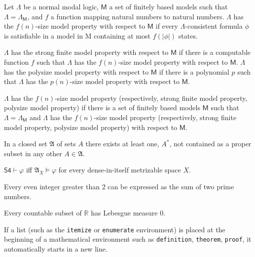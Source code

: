 \documentclass[manuscript]{BSLstyle} %
\begin{document}
\begin{definition}
	Let $\Lambda$ be a normal modal logic, $\mathsf{M}$ a set of finitely based models such that $\Lambda=\Lambda_\mathsf{M}$, and $f$ a function mapping natural numbers to natural numbers. $\Lambda$ has the $f(n)$-size model property with respect to $\mathsf{M}$ if every $\Lambda$-consistent formula $\phi$ is satisfiable in a model in M containing at most $f(|\phi|)$ states.
	
	$\Lambda$ has the strong finite model property with respect to $\mathsf{M}$ if there is a computable function $f$ such that $\Lambda$ has the $f(n)$-size model property with respect to $\mathsf{M}$. $\Lambda$ has the polysize model property with respect to $\mathsf{M}$ if there is a polynomial $p$ such that $\Lambda$ has the $p(n)$-size model property with respect to $\mathsf{M}$.
	
	$\Lambda$ has the $f(n)$-size model property (respectively, strong finite model property, polysize model property) if there is a set of finitely based models $\mathsf{M}$ such that $\Lambda=\Lambda_\mathsf{M}$ and $\Lambda$ has the $f(n)$-size model property (respectively, strong finite model property, polysize model property) with respect to $\mathsf{M}$.
\end{definition}

\begin{lemma}
	In a closed set $\mathfrak{A}$ of sets $A$ there exists at least one, $A^*$,
	not contained as a proper subset in any other $A\in\mathfrak{A}$. 
\end{lemma}

\begin{theorem}
	$\mathsf{S4}\vdash\varphi$ iff $\mathfrak{A}_X\vDash\varphi$ for every dense-in-itself metrizable space $X$.
\end{theorem}

\begin{conjecture*}[Goldbach]
	Every even integer greater than 2 can be expressed as the sum of two prime numbers.
\end{conjecture*}

\begin{remark}
	Every countable subset of $\mathbb{R}$ has Lebesgue measure 0.
\end{remark}

If a list (such as the \texttt{itemize} or \texttt{enumerate} environment) is placed at the beginning of a mathematical environment such as \texttt{definition}, \texttt{theorem}, \texttt{proof}, it automatically starts in a new line.
\end{document}
